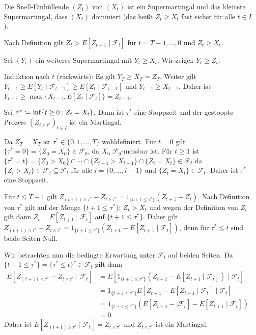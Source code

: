 \documentclass[a4paper,twoside,DIV15,BCOR12mm]{scrbook}
\newcommand{\cF}{\mathcal F}
\begin{document}
\begin{satz}
\label{satz:2.10.4}Die Snell-Einhüllende $(Z_t)$ von $(X_t)$ ist ein Supermartingal und das kleinste Supermartingal, dass $(X_t)$ dominiert (das heißt $Z_t\ge X_t$ fast sicher für alle $t\in I$).
\end{satz}

\begin{beweis}
Nach Definition gilt $Z_t > E[Z_{t+1}\mid \cF_t]$ für $t=T-1,\ldots,0$ und $Z_t \ge X_t$.

Sei $(Y_t)$ ein weiteres Supermartingal mit $Y_t \ge X_t$. Wir zeigen $Y_t \ge Z_t$.

Induktion nach $t$ (rückwärts): Es gilt $Y_T \ge X_T = Z_T$. Weiter gilt $Y_{t-1} \ge E[Y_t\mid \cF_{t-1}] \ge E[Z_t\mid \cF_{t-1}]$ und $Y_{t-1} \ge X_{t-1}$. Daher ist $Y_{t-1} \ge \max\{X_{t-1}, E[Z_t\mid \cF_t]\} = Z_{t-1}$.
\end{beweis}

\begin{lemma}
Sei $\tau^* \da \inf \{t\ge 0 : Z_t = X_t\}$. Dann ist $\tau^*$ eine Stoppzeit und der gestoppte Prozess $(Z_{t\wedge \tau^*})_{t\in I}$ ist ein Martingal.\label{lem:2.10.5}
\end{lemma}

\begin{beweis}
Da $Z_T=X_T$ ist $\tau^*\in\{0,1,\ldots,T\}$ wohldefiniert. Für $t=0$ gilt $\{\tau^*=0\} = \{Z_0=X_0\} \in \cF_0$, da $X_0$ $\cF_0$-messbar ist. Für $t\ge 1$ ist $\{\tau^* = t\} = \{Z_0 > X_0\}\cap\cdots\cap \{Z_{t-1} > X_{t-1}\}\cap \{Z_t = X_t \} \in \cF_t$ da $\{Z_i > X_i\} \in \cF_i \subseteq \cF_t$ für alle $i=\{0,\ldots,t-1\}$ und $\{Z_t=X_t\} \in \cF_t$. Daher ist $\tau^*$ eine Stoppzeit.

Für $t\le T-1$ gilt $Z_{(t+1)\wedge \tau^*} - Z_{t\wedge \tau^*} = 1_{\{t+1\le \tau^*\}}(Z_{t+1} - Z_t)$. Nach Definition von $\tau^*$ gilt auf der Menge $\{t+1\le \tau^*\}$: $Z_t > X_t$ und wegen der Definition von $Z_t$ gilt dann $Z_t = E[Z_{t+1} \mid \cF_t]$ auf $\{t+1 \le \tau^*\}$. Daher gilt $Z_{(t+1)\wedge \tau^*} - Z_{t\wedge \tau^*} = 1_{\{t+1\le \tau^*\}}(Z_{t+1} - E[Z_{t+1} \mid \cF_t])$, denn für $\tau^*\le t$ sind beide Seiten Null.

Wir betrachten nun die bedingte Erwartung unter $\cF_t$ auf beiden Seiten. Da $\{t+1\le \tau^*\} = \{\tau^* \le t\}^c \in \cF_t$ gilt dann
\begin{align*}
E[Z_{(t+1)\wedge \tau^*} - Z_{t\wedge \tau^*}\mid \cF_t]
&= E[1_{\{t+1\le \tau^*\}}(Z_{t+1} - E[Z_{t+1} \mid \cF_t])\mid \cF_t]\\
&= 1_{\{t+1\le \tau^*\}}E[Z_{t+1} - E[Z_{t+1} \mid \cF_t]\mid \cF_t]\\
&= 1_{\{t+1\le \tau^*\}}(E[Z_{t+1} - \mid \cF_t] -E[Z_{t+1} \mid \cF_t])\\
&= 0.
\end{align*}
Daher ist $E[Z_{(t+1)\wedge \tau^*}\mid \cF_t] =  Z_{t\wedge \tau^*}$ und $Z_{t\wedge \tau^*}$ ist ein Martingal.
\end{beweis}
\end{document}

